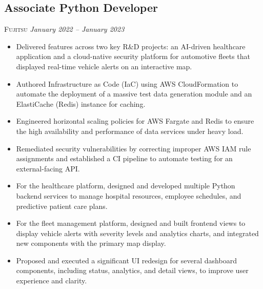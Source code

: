 \documentclass[a4paper, 12pt]{article} %
\begin{document}
\subsection{Associate Python Developer}
\textsc{Fujitsu} \textit{January 2022 – January 2023}
\begin{itemize}
    \itemsep -0.5em %
    \item Delivered features across two key R\&D projects: an AI-driven healthcare application and a cloud-native security platform for automotive fleets that displayed real-time vehicle alerts on an interactive map.
    \item Authored Infrastructure as Code (IaC) using AWS CloudFormation to automate the deployment of a massive test data generation module and an ElastiCache (Redis) instance for caching.
    \item Engineered horizontal scaling policies for AWS Fargate and Redis to ensure the high availability and performance of data services under heavy load.
    \item Remediated security vulnerabilities by correcting improper AWS IAM rule assignments and established a CI pipeline to automate testing for an external-facing API.
    \item For the healthcare platform, designed and developed multiple Python backend services to manage hospital resources, employee schedules, and predictive patient care plans.
    \item For the fleet management platform, designed and built frontend views to display vehicle alerts with severity levels and analytics charts, and integrated new components with the primary map display.
    \item Proposed and executed a significant UI redesign for several dashboard components, including status, analytics, and detail views, to improve user experience and clarity.
\end{itemize}

\end{document}
